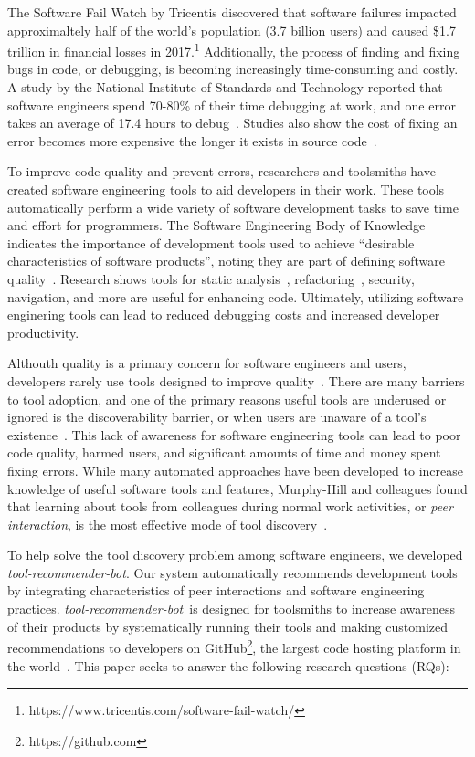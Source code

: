 \documentclass[conference]{IEEEtran}
\newcommand{\tool}{\textsl{tool-recommender-bot}}
\begin{document}
The Software Fail Watch by Tricentis discovered that software failures impacted approximaltely half of the world's population (3.7 billion users) and caused \$1.7 trillion in financial losses in 2017.\footnote{https://www.tricentis.com/software-fail-watch/} Additionally, the process of finding and fixing bugs in code, or debugging, is becoming increasingly time-consuming and costly.  A study by the National Institute of Standards and Technology reported that software engineers spend 70-80\% of their time debugging at work, and one error takes an average of 17.4 hours to debug~\cite{NIST}. Studies also show the cost of fixing an error becomes more expensive the longer it exists in source code~\cite{SEEconomics, SoftwareAssuranceSDLC}.

To improve code quality and prevent errors, researchers and toolsmiths have created software engineering tools to aid developers in their work. These tools automatically perform a wide variety of software development tasks to save time and effort for programmers. The Software Engineering Body of Knowledge indicates the importance of development tools used to achieve ``desirable characteristics of software products'', noting they are part of defining software quality~\cite{SWEBOK}. Research shows tools for static analysis~\cite{UsingStaticAnalysis}, refactoring~\cite{Murphy-HillFitness}, security, navigation, and more are useful for enhancing code. Ultimately, utilizing software enginering tools can lead to reduced debugging costs and increased developer productivity.

Althouth quality is a primary concern for software engineers and users, developers rarely use tools designed to improve quality~\cite{Johnson2013Why}. There are many barriers to tool adoption, and one of the primary reasons useful tools are underused or ignored is the discoverability barrier, or when users are unaware of a tool's existence~\cite{Murphy-HillScreencastingDiscovery}. This lack of awareness for software engineering tools can lead to poor code quality, harmed users, and significant amounts of time and money spent fixing errors. While many automated approaches have been developed to increase knowledge of useful software tools and features, Murphy-Hill and colleagues found that learning about tools from colleagues during normal work activities, or \textit{peer interaction}, is the most effective mode of tool discovery~\cite{MurphyHill2011PeerInteraction}.

To help solve the tool discovery problem among software engineers, we developed \tool. Our system automatically recommends development tools by integrating characteristics of peer interactions and software engineering practices. \tool~is designed for toolsmiths to increase awareness of their products by systematically running their tools and making customized recommendations to developers on GitHub\footnote{https://github.com}, the largest code hosting platform in the world~\cite{GousiosGitHub}. This paper seeks to answer the following research questions (RQs): \\
\end{document}
